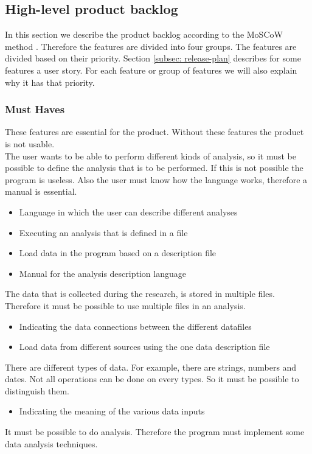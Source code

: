 \subsection{High-level product backlog}
\label{subsec: MoSCoW}
In this section we describe the product backlog according to the MoSCoW method \cite{moscowref}. Therefore the features are divided into four groups. The features are divided based on their priority. Section \ref{subsec: release-plan} describes for some features a user story. For each feature or group of features we will also explain why it has that priority.
\subsubsection{Must Haves}
These features are essential for the product. Without these features the product is not usable. \\
The user wants to be able to perform different kinds of analysis, so it must be possible to define the analysis that is to be performed. If this is not possible the program is useless. Also the user must know how the language works, therefore a manual is essential.
\begin{itemize}
  \item Language in which the user can describe different analyses
  \item Executing an analysis that is defined in a file
  \item Load data in the program based on a description file
  \item Manual for the analysis description language
\end{itemize}
The data that is collected during the research, is stored in multiple files. Therefore it must be possible to use multiple files in an analysis.
\begin{itemize}
  \item Indicating the data connections between the different datafiles
  \item Load data from different sources using the one data description file
\end{itemize}
There are different types of data. For example, there are strings, numbers and dates. Not all operations can be done on every types. So it must be possible to distinguish them.
\begin{itemize}
  \item Indicating the meaning of the various data inputs
\end{itemize}
It must be possible to do analysis. Therefore the program must implement some data analysis techniques.
